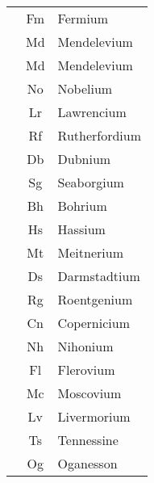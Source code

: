 \documentclass{article}
\begin{document}
\begin{table}[h!]
\begin{minipage}{0.33\textwidth}
\begin{tabular}{>{\Rownum}ccl}
			             & Fm           & Fermium          \\
			             & Md           & Mendelevium      \\
			             & Md           & Mendelevium      \\
			             & No           & Nobelium         \\
			             & Lr           & Lawrencium       \\
			             & Rf           & Rutherfordium    \\
			             & Db           & Dubnium          \\
			             & Sg           & Seaborgium       \\
			             & Bh           & Bohrium          \\
			             & Hs           & Hassium          \\
			             & Mt           & Meitnerium       \\
			             & Ds           & Darmstadtium     \\
			             & Rg           & Roentgenium      \\
			             & Cn           & Copernicium      \\
			             & Nh           & Nihonium         \\
			             & Fl           & Flerovium        \\
			             & Mc           & Moscovium        \\
			             & Lv           & Livermorium      \\
			             & Ts           & Tennessine       \\
			             & Og           & Oganesson        \\
			\bottomrule
		\end{tabular}
	\end{minipage}
\end{table}
\end{document}
